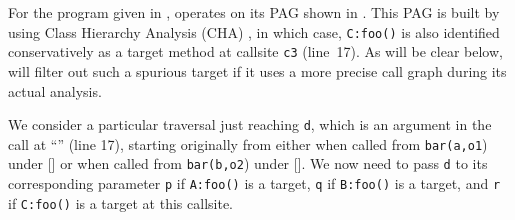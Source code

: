 For the program given in , \manuLFC operates on its PAG 
shown in . This PAG is built by using Class Hierarchy Analysis (CHA) \cite{dean1995optimization}, in which
case,
 \texttt{C:foo()} is also identified conservatively as a target method at callsite {\texttt{c3}} (line~17). As will be clear below, \manuLFC will filter out 
 such a spurious target if it uses a more precise call graph during its actual analysis.
 
We consider a particular traversal
just reaching 
\texttt{d}, which is an argument in the
call at
``'' (line 17), starting originally 
from either  when called from
\texttt{bar(a,o1}) under  [] or
 when called from
\texttt{bar(b,o2}) under  []. We now need to pass \texttt{d} to its
corresponding parameter \texttt{p} if \texttt{A:foo()} is a target, \texttt{q} if \texttt{B:foo()} is a target, and \texttt{r} if \texttt{C:foo()} is a target at this
callsite.



